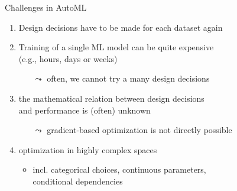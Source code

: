 \begin{frame}[c]{Challenges in AutoML}

\begin{enumerate}
  \item Design decisions have to be made for each dataset again
  \smallskip
  \pause
  \item Training of a single ML model can be quite expensive\\
  		(e.g., hours, days or weeks)
  \begin{itemize}
    \item[$\leadsto$] often, we cannot try a many design decisions
  \end{itemize}
  \smallskip
  \pause
  \item the mathematical relation between design decisions\\ and performance is (often) unknown
  \begin{itemize}
    \item[$\leadsto$] gradient-based optimization is not directly possible
  \end{itemize}
  \smallskip
  \pause
  \item optimization in highly complex spaces
  \begin{itemize}
    \item incl. categorical choices, continuous parameters,\\ conditional dependencies
  \end{itemize}
  
\end{enumerate}

\end{frame}
